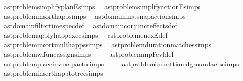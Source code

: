 \begin{isabellebody}
\ \ ast{\isacharunderscore}{\kern0pt}problem{\isachardot}{\kern0pt}simplify{\isacharunderscore}{\kern0pt}planE{\isachardot}{\kern0pt}simps\isanewline
\ \ ast{\isacharunderscore}{\kern0pt}problem{\isachardot}{\kern0pt}simplify{\isacharunderscore}{\kern0pt}actionE{\isachardot}{\kern0pt}simps\isanewline
\ \ ast{\isacharunderscore}{\kern0pt}problem{\isachardot}{\kern0pt}insort{\isacharunderscore}{\kern0pt}happ{\isachardot}{\kern0pt}simps\isanewline
\ \ ast{\isacharunderscore}{\kern0pt}domain{\isachardot}{\kern0pt}inst{\isacharunderscore}{\kern0pt}snap{\isacharunderscore}{\kern0pt}action{\isachardot}{\kern0pt}simps\isanewline
\ \ ast{\isacharunderscore}{\kern0pt}domain{\isachardot}{\kern0pt}filter{\isacharunderscore}{\kern0pt}time{\isacharunderscore}{\kern0pt}spec{\isacharunderscore}{\kern0pt}def\isanewline
\ \ ast{\isacharunderscore}{\kern0pt}domain{\isachardot}{\kern0pt}conjunct{\isacharunderscore}{\kern0pt}effects{\isacharunderscore}{\kern0pt}def\isanewline
\ \ \isanewline
\ \ ast{\isacharunderscore}{\kern0pt}problem{\isachardot}{\kern0pt}apply{\isacharunderscore}{\kern0pt}happ{\isacharunderscore}{\kern0pt}exec{\isachardot}{\kern0pt}simps\isanewline
\ \ ast{\isacharunderscore}{\kern0pt}problem{\isachardot}{\kern0pt}en{\isacharunderscore}{\kern0pt}exE{\isacharunderscore}{\kern0pt}def\isanewline
\ \ ast{\isacharunderscore}{\kern0pt}problem{\isachardot}{\kern0pt}insort{\isacharunderscore}{\kern0pt}mult{\isacharunderscore}{\kern0pt}happs{\isachardot}{\kern0pt}simps\isanewline
\ \ ast{\isacharunderscore}{\kern0pt}problem{\isachardot}{\kern0pt}duration{\isacharunderscore}{\kern0pt}matches{\isacharprime}{\kern0pt}{\isachardot}{\kern0pt}simps\isanewline
\ \ ast{\isacharunderscore}{\kern0pt}problem{\isachardot}{\kern0pt}wf{\isacharunderscore}{\kern0pt}func{\isacharunderscore}{\kern0pt}assign{\isacharprime}{\kern0pt}{\isachardot}{\kern0pt}simps\isanewline
\ \ \isanewline
\ \ ast{\isacharunderscore}{\kern0pt}problem{\isachardot}{\kern0pt}mp{\isacharunderscore}{\kern0pt}Fevl{\isacharunderscore}{\kern0pt}def\isanewline
\ \ ast{\isacharunderscore}{\kern0pt}problem{\isachardot}{\kern0pt}place{\isacharunderscore}{\kern0pt}inv{\isacharunderscore}{\kern0pt}snap{\isacharunderscore}{\kern0pt}acts{\isachardot}{\kern0pt}simps\isanewline
\ \ \isanewline
\ \ ast{\isacharunderscore}{\kern0pt}problem{\isachardot}{\kern0pt}insort{\isacharunderscore}{\kern0pt}timed{\isacharunderscore}{\kern0pt}ground{\isacharunderscore}{\kern0pt}acts{\isachardot}{\kern0pt}simps\isanewline
\ \ ast{\isacharunderscore}{\kern0pt}problem{\isachardot}{\kern0pt}insert{\isacharunderscore}{\kern0pt}happ{\isacharunderscore}{\kern0pt}to{\isacharunderscore}{\kern0pt}tree{\isachardot}{\kern0pt}simps\isanewline

\end{isabellebody}
